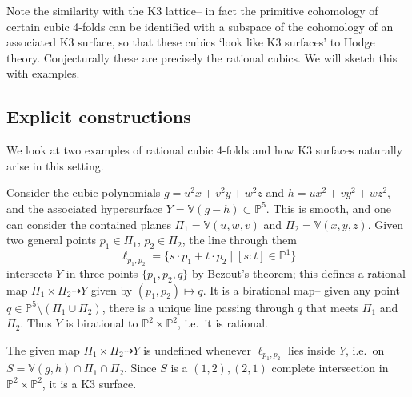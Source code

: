 Note the similarity with the K3 lattice-- in fact the primitive cohomology of
certain cubic 4-folds can be identified with a subspace of the cohomology of an
associated K3 surface, so that these cubics `look like K3 surfaces' to Hodge
theory. Conjecturally these are precisely the rational cubics. We will sketch this with examples.

\subsection{Explicit constructions} We look at two examples of
rational cubic 4-folds and how K3 surfaces naturally arise in this setting.

\begin{example}
    Consider the cubic polynomials \(g=u^2x+v^2y+w^2z\) and
    \(h=ux^2+vy^2+wz^2\), and the associated hypersurface
    \(Y=\mathbb{V}(g-h)\subset \mathbb{P}^5\). This is smooth, and one can
    consider the contained planes \(\Pi_1=\mathbb{V}(u,w,v)\) and
    \(\Pi_2=\mathbb{V}(x,y,z)\). Given
    two general points \(p_1\in \Pi_1\), \(p_2\in \Pi_2\), the line through them
    \[\ell_{p_1,p_2}=\{s\cdot p_1+ t\cdot p_2\;|\; [s:t]\in \mathbb{P}^1\}\]
    intersects \(Y\) in three points \(\{p_1,p_2,q\}\) by Bezout's
    theorem; this defines a rational map \(\Pi_1\times \Pi_2\dashrightarrow Y\)
    given by \((p_1,p_2)\mapsto q\). It is a birational map-- given any point
    \(q\in \mathbb{P}^5\setminus (\Pi_1\cup \Pi_2)\), there is a unique line
    passing through \(q\) that meets \(\Pi_1\) and \(\Pi_2\). Thus \(Y\) is
    birational to \(\mathbb{P}^2\times \mathbb{P}^2\), i.e.\ it is rational.

    The given map \(\Pi_1\times \Pi_2\dashrightarrow Y\)  is undefined whenever
    \(\ell_{p_1,p_2}\) lies  inside \(Y\), i.e.\ on \(S=\mathbb{V}(g,h)\cap
    \Pi_1\cap \Pi_2\). Since \(S\) is a
    \((1,2),(2,1)\) complete intersection in \(\mathbb{P}^2\times
    \mathbb{P}^2\), it is a K3 surface.
\end{example}

